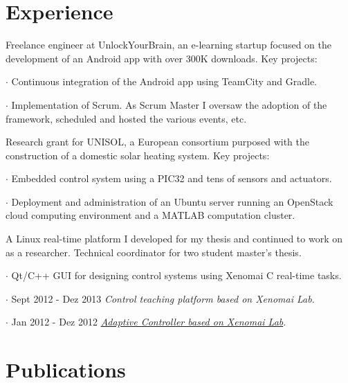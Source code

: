 \section*{Experience}

{
Freelance engineer at UnlockYourBrain, an e-learning startup focused on the development
of an Android app with over 300K downloads. Key projects:

$\cdot$  Continuous integration of the Android app using TeamCity and Gradle.

$\cdot$  Implementation of Scrum. As Scrum Master I oversaw the
adoption of the framework, scheduled and hosted  the various events, etc.

}

\vspace{\baselineskip}
{
Research grant for UNISOL, a European consortium purposed with the construction
of a domestic solar heating system. Key projects:

$\cdot$  Embedded control system using a PIC32 and tens of sensors and
actuators.

$\cdot$  Deployment and administration of an Ubuntu server running an
OpenStack cloud computing environment and a MATLAB computation cluster.
}

\vspace{\baselineskip}
{
A Linux real-time platform I developed for my thesis and continued to work on as a
researcher. Technical coordinator for two student master's thesis.

$\cdot$  Qt/C++ GUI for designing control systems using Xenomai C real-time tasks.

$\cdot$ Sept 2012 - Dez 2013 \emph{Control teaching platform based on Xenomai Lab}.

$\cdot$ Jan 2012 - Dez 2012 \href{http://ria.ua.pt/handle/10773/10933}{\emph{Adaptive Controller based on Xenomai Lab}}.
}

\section*{Publications}

